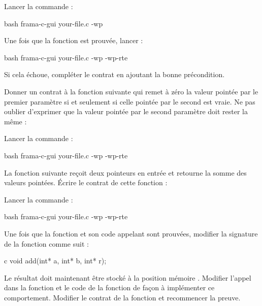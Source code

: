 

Lancer la commande :


\begin{CodeBlock}{bash}
frama-c-gui your-file.c -wp
\end{CodeBlock}


Une fois que la fonction est prouvée, lancer :

\begin{CodeBlock}{bash}
frama-c-gui your-file.c -wp -wp-rte
\end{CodeBlock}


Si cela échoue, compléter le contrat en ajoutant la bonne précondition.




Donner un contrat à la fonction suivante qui remet à zéro la valeur
pointée par le premier paramètre si et seulement si celle pointée par le
second est vraie. Ne pas oublier d'exprimer que la valeur pointée par le second
paramètre doit rester la même :




Lancer la commande :


\begin{CodeBlock}{bash}
frama-c-gui your-file.c -wp -wp-rte
\end{CodeBlock}




La fonction suivante reçoit deux pointeurs en entrée et retourne la
somme des valeurs pointées. Écrire le contrat de cette fonction :




Lancer la commande :


\begin{CodeBlock}{bash}
frama-c-gui your-file.c -wp -wp-rte
\end{CodeBlock}


Une fois que la fonction et son code appelant sont prouvées, modifier
la signature de la fonction comme suit :


\begin{CodeBlock}{c}
void add(int* a, int* b, int* r);
\end{CodeBlock}


Le résultat doit maintenant être stocké à la position mémoire .
Modifier l'appel dans la fonction  et le code de la fonction de
façon à implémenter ce comportement. Modifier le contrat de la fonction
 et recommencer la preuve.


